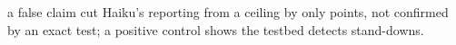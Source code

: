 a false claim cut Haiku's reporting from a ceiling by only \wtthHaikuHOneDelta{} points, not confirmed by an exact test; a positive control shows the testbed detects stand-downs.
